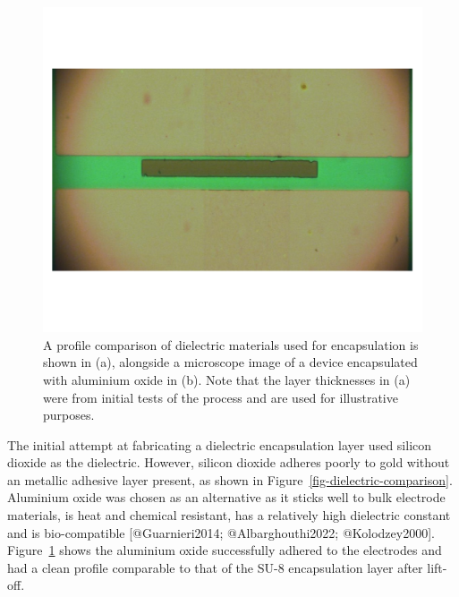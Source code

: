 \documentclass[
  letterpaper,
  DIV=11,
  numbers=noendperiod]{scrartcl}
\begin{document}
\begin{figure}
\begin{minipage}[t]{0.45\linewidth}
{{\includegraphics{figures/ch4/al2o3_encapsulation.png}

}

}

\subcaption{\label{fig-al2o3-encapsulation}}
\end{minipage}%

\caption{\label{fig-dektat-dielectric-layer}A profile comparison of
dielectric materials used for encapsulation is shown in (a), alongside a
microscope image of a device encapsulated with aluminium oxide in (b).
Note that the layer thicknesses in (a) were from initial tests of the
process and are used for illustrative purposes.}

\end{figure}

The initial attempt at fabricating a dielectric encapsulation layer used
silicon dioxide as the dielectric. However, silicon dioxide adheres
poorly to gold without an metallic adhesive layer present, as shown in
Figure~\ref{fig-dielectric-comparison}. Aluminium oxide was chosen as an
alternative as it sticks well to bulk electrode materials, is heat and
chemical resistant, has a relatively high dielectric constant and is
bio-compatible {[}@Guarnieri2014; @Albarghouthi2022; @Kolodzey2000{]}.
Figure~\ref{fig-dektat-dielectric-layer} shows the aluminium oxide
successfully adhered to the electrodes and had a clean profile
comparable to that of the SU-8 encapsulation layer after lift-off.
\end{document}
